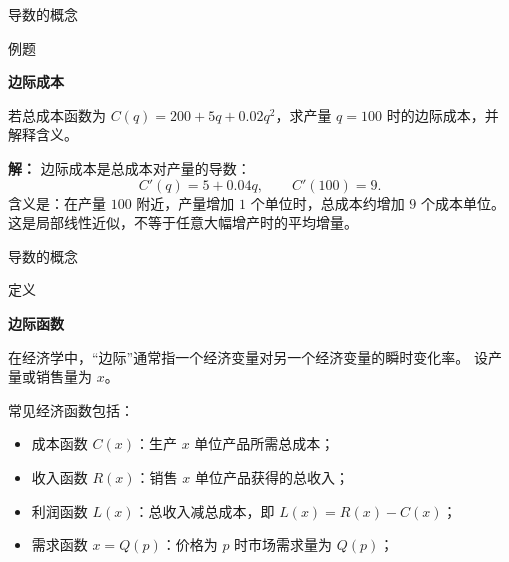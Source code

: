 \documentclass[aspectratio=169,10pt,fontset=fandol]{ctexbeamer}
\begin{document}
\begin{frame}[t,fragile]{导数的概念}
\normalsize
\begin{block}{例题}
{\normalsize
\textbf{边际成本}\par

若总成本函数为 $C(q)=200+5q+0.02q^2$，求产量 $q=100$ 时的边际成本，并解释含义。

}
\end{block}
\pause
{\normalsize
\textbf{解：}
边际成本是总成本对产量的导数：
\[
C'(q)=5+0.04q,\qquad C'(100)=9.
\]
含义是：在产量 $100$ 附近，产量增加 $1$ 个单位时，总成本约增加 $9$ 个成本单位。 这是局部线性近似，不等于任意大幅增产时的平均增量。

}
\end{frame}
\begin{frame}[t,fragile]{导数的概念}
\normalsize
\begin{block}{定义}
{\normalsize
\textbf{边际函数}\par

在经济学中，“边际”通常指一个经济变量对另一个经济变量的瞬时变化率。 设产量或销售量为 $x$。

常见经济函数包括：
\begin{itemize}
\item 成本函数 $C(x)$：生产 $x$ 单位产品所需总成本；
\item 收入函数 $R(x)$：销售 $x$ 单位产品获得的总收入；
\item 利润函数 $L(x)$：总收入减总成本，即 $L(x)=R(x)-C(x)$；
\item 需求函数 $x=Q(p)$：价格为 $p$ 时市场需求量为 $Q(p)$；

\end{itemize}
}
\end{block}
\end{frame}
\end{document}
